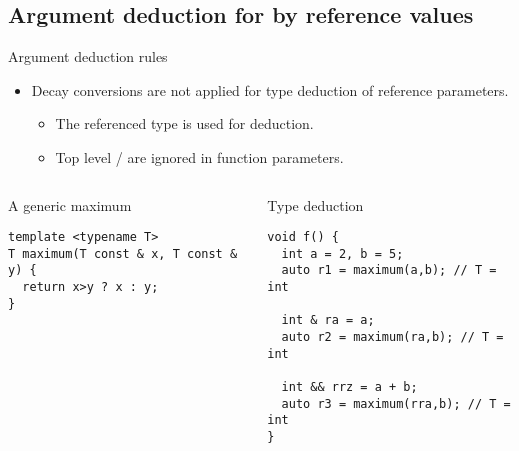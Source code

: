 \subsection{Argument deduction for by reference values}

\begin{frame}[t,fragile]{Argument deduction rules}
\begin{itemize}
  \item Decay conversions are not applied for type deduction of reference parameters.
    \begin{itemize}
      \item The referenced type is used for deduction.
      \item Top level / are ignored in function parameters.
    \end{itemize}
\end{itemize}

\begin{columns}[T]

\begin{block}{A generic maximum}
\begin{lstlisting}
template <typename T>
T maximum(T const & x, T const & y) {
  return x>y ? x : y;
}
\end{lstlisting}
\end{block}

\begin{block}{Type deduction}
\begin{lstlisting}
void f() {
  int a = 2, b = 5;
  auto r1 = maximum(a,b); // T = int

  int & ra = a;
  auto r2 = maximum(ra,b); // T = int

  int && rrz = a + b;
  auto r3 = maximum(rra,b); // T = int
}
\end{lstlisting}
\end{block}
\end{columns}

\end{frame}

